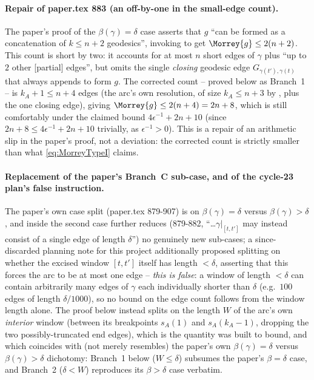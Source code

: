 \begin{lemma}
  \paragraph{Repair of paper.tex 883 (an off-by-one in the small-edge count).} The paper's proof of
  the $\beta(\gamma)=\delta$ case asserts that $g$ ``can be formed as a concatenation of $k\le n+2$
  geodesics'', invoking  to get $\Morrey{g}\le2(n+2)$. This count is short by
  two: it accounts for at most $n$ short edges of $\gamma$ plus ``up to $2$ other [partial] edges'',
  but omits the single \emph{closing} geodesic edge $G_{\gamma(t'),\gamma(t)}$ that
   always appends to form $g$. The corrected count -- proved below as Branch~1 --
  is $k_A+1\le n+4$ edges (the arc's own resolution, of size $k_A\le n+3$ by
  , plus
  the one closing edge), giving $\Morrey{g}\le2(n+4)=2n+8$, which is still comfortably under the
  claimed bound $4\epsilon^{-1}+2n+10$ (since $2n+8\le4\epsilon^{-1}+2n+10$ trivially, as
  $\epsilon^{-1}>0$). This is a repair of an arithmetic slip in the paper's proof, not a deviation:
  the corrected count is strictly smaller than what \eqref{eq:MorreyTypeI} claims.

  \paragraph{Replacement of the paper's Branch~C sub-case, and of the cycle-23 plan's false
  instruction.} The paper's own case split (paper.tex 879-907) is on $\beta(\gamma)=\delta$ versus
  $\beta(\gamma)>\delta$, and inside the second case further reduces (879-882, ``\ldots $\gamma
  |_{[t,t']}$ may instead consist of a single edge of length $\delta$'') no genuinely new
  sub-cases; a since-discarded planning note for this project additionally proposed splitting on
  whether the excised window $[t,t']$ itself has length $<\delta$, asserting that this forces the
  arc to be at most one edge -- \emph{this is false}: a window of length $<\delta$ can contain
  arbitrarily many edges of $\gamma$ each individually shorter than $\delta$ (e.g.\ $100$ edges of
  length $\delta/1000$), so no bound on the edge count follows from the window length alone. The
  proof below instead splits on the length $W$ of the arc's own \emph{interior} window (between its
  breakpoints $s_A(1)$ and $s_A(k_A-1)$, dropping the two possibly-truncated end edges), which is
  the quantity  was built to bound, and which coincides with (not
  merely resembles) the paper's own $\beta(\gamma)=\delta$ versus $\beta(\gamma)>\delta$ dichotomy:
  Branch~1 below ($W\le\delta$) subsumes the paper's $\beta=\delta$ case, and Branch~2 ($\delta<W$)
  reproduces its $\beta>\delta$ case verbatim.
\end{lemma}
